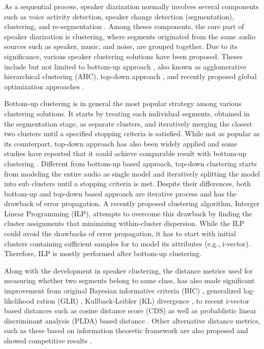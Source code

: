 \documentclass[journal,10pt]{IEEEtran}
\begin{document}
As a sequential process, speaker diarization normally involves several components such as voice activity detection, speaker change detection (segmentation), clustering, and re-segmentation \cite{reynolds2005approaches,tranter2006overview,anguera2012speaker}. Among theses components, the core part of speaker diarization is clustering, where  segments originated from the same audio sources such as speaker, music, and noise, are grouped together. Due to its significance, various speaker clustering solutions have been proposed. Theses include but not limited to bottom-up approach \cite{wooters2008icsi,vijayasenan2009information,sun2010speaker}, also known as agglomerative hierarchical clustering (AHC), top-down approach \cite{meignier2006step,bozonnet2010lia,shum2013unsupervised}, and recently proposed global optimization approaches \cite{rouvier2012global, dupuy2014recent}. 

Bottom-up clustering is in general the most popular strategy among various clustering solutions. It starts by treating each individual segments, obtained in the segmentation stage, as separate clusters, and iteratively merging the closest two clusters until a specified stopping criteria is satisfied. While not as popular as its counterpart, top-down approach has also been widely applied and some studies have reported that it could achieve comparable result with bottom-up clustering \cite{evans2012comparative}. Different from bottom-up based approach, top-down clustering starts from modeling the entire audio as single model and iteratively splitting the model into sub clusters until a stopping criteria is met. Despite their differences, both bottom-up and top-down based approach are iterative process and has the drawback of error propagation. A recently proposed clustering algorithm, Interger Linear Programming (ILP)\cite{rouvier2012global, dupuy2014recent}, attempts to overcome this drawback by finding the cluster assignments that minimizing within-cluster dispersion. While the ILP could avoid the drawbacks of error propagation, it has to start with initial clusters containing sufficient samples for to model its attributes (e.g., i-vector). Therefore, ILP is mostly performed after bottom-up clustering.

Along with the development in speaker clustering, the distance metrics used for measuring whether two segments belong to same class, has also made significant improvement from original Bayesian informative criteria (BIC) \cite{chen1998speaker,zhou2000unsupervised}, generalized log-likelihood ration (GLR) \cite{solomonoff1998clustering}, Kullback-Leibler (KL) divergence \cite{siegler1997automatic}, to recent i-vector based distances such as cosine distance score (CDS) \cite{dehak2011front} as well as probablistic linear discriminant analysis (PLDA) based distance \cite{prince2007probabilistic,kenny2010bayesian}. Other alternative distance metrics, such as these based on information theoretic framework are also proposed and showed competitive results \cite{vijayasenan2009information}. 
\end{document}
